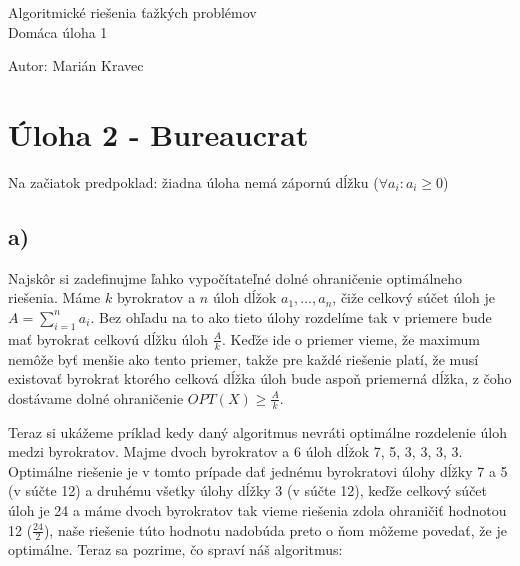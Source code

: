 \documentclass[a4paper]{article}
\begin{document}
 
	
\pagestyle{plain}

\begin{center}
	\sc\large
	Algoritmické riešenia ťažkých problémov\\
	Domáca úloha 1
\end{center}

Autor: Marián Kravec

\section{Úloha 2 - Bureaucrat}

Na začiatok predpoklad: žiadna úloha nemá zápornú dĺžku ($\forall a_i: a_i\geq 0$)

\subsection*{a)}
\label{dolnOhr}
Najskôr si zadefinujme ľahko vypočítateľné dolné ohraničenie optimálneho riešenia. Máme $k$ byrokratov a $n$ úloh dĺžok $a_1, ..., a_n$, čiže celkový súčet úloh je $A = \sum_{i=1}^{n} a_i$. Bez ohľadu na to ako tieto úlohy rozdelíme tak v priemere bude mať byrokrat celkovú dĺžku úloh $\frac{A}{k}$. Keďže ide o priemer vieme, že maximum nemôže byť menšie ako tento priemer, takže pre každé riešenie platí, že musí existovať byrokrat ktorého celková dĺžka úloh bude aspoň priemerná dĺžka, z čoho dostávame dolné ohraničenie $OPT(X) \geq \frac{A}{k}$.

Teraz si ukážeme príklad kedy daný algoritmus nevráti optimálne rozdelenie úloh medzi byrokratov. Majme dvoch byrokratov a 6 úloh dĺžok 7, 5, 3, 3, 3, 3.
Optimálne riešenie je v tomto prípade dať jednému byrokratovi úlohy dĺžky 7 a 5 (v súčte 12) a druhému všetky úlohy dĺžky 3 (v súčte 12), keďže celkový súčet úloh je 24 a máme dvoch byrokratov tak vieme riešenia zdola ohraničiť hodnotou 12 ($\frac{24}{2}$), naše riešenie túto hodnotu nadobúda preto o ňom môžeme povedať, že je optimálne. Teraz sa pozrime, čo spraví náš algoritmus: 
\end{document}
